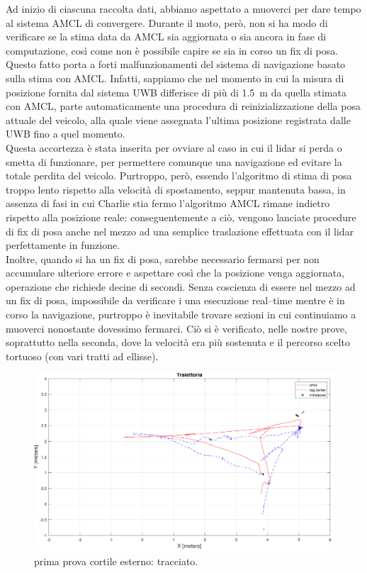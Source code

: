 \vspace{0.5cm}
Ad inizio di ciascuna raccolta dati, abbiamo aspettato a muoverci per dare tempo al sistema AMCL di convergere. Durante il moto, però, non si ha modo di verificare se la stima data da AMCL sia aggiornata o sia ancora in fase di computazione, così come non è possibile capire se sia in corso un fix di posa. Questo fatto porta a forti malfunzionamenti del sistema di navigazione basato sulla stima con AMCL. Infatti, sappiamo che nel momento in cui la misura di posizione fornita dal sistema UWB differisce di più di \SI{1.5}{\metre} da quella stimata con AMCL, parte automaticamente una procedura di reinizializzazione della posa attuale del veicolo, alla quale viene assegnata l'ultima posizione registrata dalle UWB fino a quel momento.
\\
Questa accortezza è stata inserita per ovviare al caso in cui il lidar si perda o smetta di funzionare, per permettere comunque una navigazione ed evitare la totale perdita del veicolo. Purtroppo, però, essendo l'algoritmo di stima di posa troppo lento rispetto alla velocità di spostamento, seppur mantenuta bassa, in assenza di fasi in cui Charlie stia fermo l'algoritmo AMCL rimane indietro rispetto alla posizione reale: conseguentemente a ciò, vengono lanciate procedure di fix di posa anche nel mezzo ad una semplice traslazione effettuata con il lidar perfettamente in funzione.
\\
Inoltre, quando si ha un fix di posa, sarebbe necessario fermarsi per non accumulare ulteriore errore e aspettare così che la posizione venga aggiornata, operazione che richiede decine di secondi. Senza coscienza di essere nel mezzo ad un fix di posa, impossibile da verificare i una esecuzione real--time mentre è in corso la navigazione, purtroppo è inevitabile trovare sezioni in cui continuiamo a muoverci nonostante dovessimo fermarci. Ciò si è verificato, nelle nostre prove, soprattutto nella seconda, dove la velocità era più sostenuta e il percorso scelto tortuoso (con vari tratti ad ellisse).


\begin{figure}[] 
	\centering    
	\includegraphics[width=.8\textwidth]{figs/grafici_cortile/prova1/figure4.pdf}
	\caption{prima prova cortile esterno: tracciato.}
	\label{fig. percorso prima prova esterno}
\end{figure}

